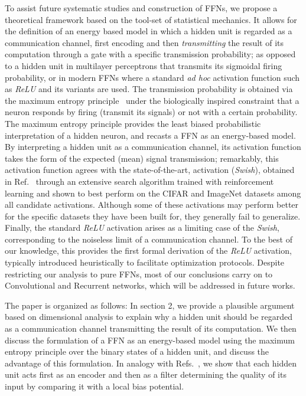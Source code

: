 \documentclass[5p]{elsarticle}
\begin{document}
To assist future systematic studies and construction of FFNs,  we propose a theoretical framework based on the tool-set of statistical mechanics. It allows for the definition of an energy based model in which a hidden unit is regarded as a communication channel, first encoding and then {\it transmitting} the result of its computation through a gate with a specific transmission probability; as opposed to a hidden unit in multilayer perceptrons that transmits its sigmoidal firing probability, or in modern FFNs where a standard \textit{ad hoc} activation function such as {\it ReLU} and its variants are used. The transmission probability is obtained via the maximum entropy principle~\cite{zecchina, jaynes} under the biologically inspired constraint that a neuron responds by firing (transmit its signals) or not with a certain probability. The maximum entropy principle provides the least biased probabilistic interpretation of a hidden neuron, and recasts a FFN as an energy-based model.
By interpreting a hidden unit as a communication channel, its activation function takes the form of the expected (mean) signal transmission; remarkably, this activation function agrees with the state-of-the-art, activation ({\it Swish}), obtained in Ref.~\cite{prajit} through an extensive search algorithm trained with reinforcement learning and shown to best perform on the CIFAR and ImageNet datasets among all candidate activations. Although some of these activations may perform better for the specific datasets they have been built for, they generally fail to generalize. Finally, the standard {\it ReLU} activation arises as a limiting case of the {\it Swish}, corresponding to the noiseless limit of a communication channel. To the best of our knowledge, this provides the first formal derivation of the {\it ReLU} activation, typically introduced heuristically to facilitate optimization protocols. Despite restricting our analysis to pure FFNs, most of our conclusions carry on to Convolutional and Recurrent networks, which will be addressed in future works.


The paper is organized as follows:  In section 2, we provide a plausible argument based on dimensional analysis to explain why a hidden unit should be regarded as a communication channel transmitting the result of its computation. We then discuss the formulation of a FFN as an energy-based model using the maximum entropy principle over the binary states of a hidden unit, and discuss the advantage of this formulation. In analogy with Refs.~\cite{tishby1, tishby2}, we show that each hidden unit acts first as an encoder and then as a filter determining the quality of its input by comparing it with a local bias potential.
\end{document}
